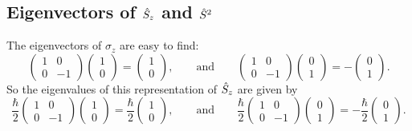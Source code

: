 \documentclass[a4paper]{article}
\theoremstyle{definition}
\begin{document}
    \subsection{Eigenvectors of \texorpdfstring{\(\hat{S}_z\)}{Sz} and \texorpdfstring{\(\hat{S}^2\)}{S2}}
    The eigenvectors of \(\sigma_z\) are easy to find:
    \[
        \begin{pmatrix}
            1 & 0\\
            0 & -1
        \end{pmatrix}
        \begin{pmatrix}
            1\\ 0
        \end{pmatrix}
        =
        \begin{pmatrix}
            1\\ 0
        \end{pmatrix}
        ,\qquad\text{and}\qquad
        \begin{pmatrix}
            1 & 0\\
            0 & -1
        \end{pmatrix}
        \begin{pmatrix}
            0\\ 1
        \end{pmatrix}
        = -
        \begin{pmatrix}
            0\\ 1
        \end{pmatrix}
        .
    \]
    So the eigenvalues of this representation of \(\hat{S}_z\) are given by
    \[
        \frac{\hbar}{2}
        \begin{pmatrix}
            1 & 0\\
            0 & -1
        \end{pmatrix}
        \begin{pmatrix}
            1\\ 0
        \end{pmatrix}
        = \frac{\hbar}{2}
        \begin{pmatrix}
            1\\ 0
        \end{pmatrix}
        ,\qquad\text{and}\qquad
        \frac{\hbar}{2}
        \begin{pmatrix}
            1 & 0\\
            0 & -1
        \end{pmatrix}
        \begin{pmatrix}
            0\\ 1
        \end{pmatrix}
        = -\frac{\hbar}{2}
        \begin{pmatrix}
            0\\ 1
        \end{pmatrix}
        .
    \]
\end{document}
